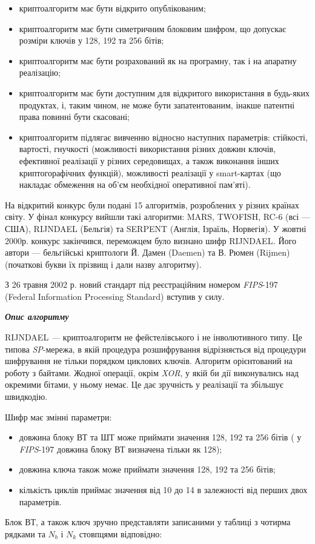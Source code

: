 \liststyleWWviiiNumxxvi
\begin{itemize}
\item криптоалгоритм має бути відкрито опублікованим;
\item криптоалгоритм має бути симетричним блоковим шифром,  що допускає розміри
ключів у 128, 192 та 256 бітів;
\item криптоалгоритм має бути розрахований як на програмну, так і на апаратну
реалізацію;
\item криптоалгоритм має бути доступним для відкритого використання в будь-яких
продуктах, і, таким чином, не може бути запатентованим, інакше патентні права
повинні бути скасовані;
\item криптоалгоритм підлягає вивченню відносно наступних параметрів: стійкості,
вартості, гнучкості (можливості використання різних довжин ключів, ефективної
реалізації у різних середовищах, а також виконання інших криптогорафічних
функцій), можливості реалізації у smart{}-картах (що накладає обмеження на
об’єм необхідної оперативної пам’яті).
\end{itemize}
На відкритий конкурс були подані 15 алгоритмів, розроблених у різних країнах
світу. У фінал конкурсу вийшли такі алгоритми: MARS, TWOFISH, RC{}-6 (всі ---
США), RIJNDAEL (Бельгія) та SERPENT\textit{ }(Англія, Ізраїль, Норвегія). У
жовтні 2000р. конкурс закінчився, переможцем було визнано шифр
RIJNDAEL\textit{.} Його автори --- бельгійські криптологи Й. Дамен (Daemen) та В.
Рюмен (Rijmen) (початкові букви їх прізвищ і дали назву алгоритму). 

З 26 травня 2002 р. новий стандарт під реєстраційним номером 
\textit{FIPS}{}-197 (Federal Information Processing Standard) вступив у силу.


\bigskip


\bigskip

{\centering\bfseries\itshape
Опис алгоритму
\par}


\bigskip

RIJNDAEL\textit{ --- }криптоалгоритм не фейстелівського і не інволютивного типу.
Це типова \textit{SP}{}-мережа, в якій процедура розшифрування відрізняється
від процедури шифрування не тільки порядком циклових ключів. Алгоритм
орієнтований на роботу з байтами. Жодної операції, окрім \textit{XOR}, у якій
би дії виконувались над окремими бітами, у ньому немає. Це дає зручність у
реалізації та збільшує швидкодію.

Шифр має змінні параметри:

\liststyleWWviiiNumxxxviii
\begin{itemize}
\item довжина блоку ВТ та ШТ може приймати значення 128, 192 та 256 бітів  ( у
\textit{FIPS}{}-197 довжина блоку ВТ визначена тільки як 128);
\item довжина ключа також може приймати значення 128, 192 та 256 бітів;
\item кількість циклів приймає значення від 10 до 14 в залежності від перших
двох параметрів.
\end{itemize}
Блок ВТ, а також ключ зручно представляти записаними у таблиці з чотирма рядками
та  ${N_{{b}}}$ і  ${N_{{k}}}$ стовпцями відповідно:


